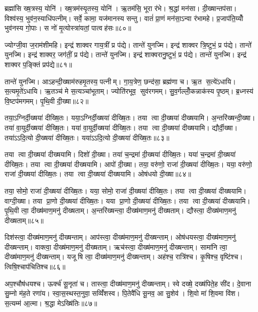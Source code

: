 ब्रह्मा॑सि ख्ष॒त्रस्य॒ योनि॑। ख्ष॒त्रम॑स्यृ॒तस्य॒ योनि॑। ऋ॒तम॑सि॒ भूरा र॑भे। श्र॒द्धां मन॑सा। दी॒ख्षान्तप॑सा। विश्व॑स्य॒ भुव॑न॒स्याधि॑पत्नीम्। सर्वे॒ कामा॒ यज॑मानस्य सन्तु। वातं॑ प्रा॒णं मन॑सा॒ऽन्वा र॑भामहे। प्र॒जाप॑ति॒य्योँ भुव॑नस्य गो॒पाः। स नो॑ मृ॒त्योस्त्रा॑यतां॒ पात्वह॑सः॥८०॥

ज्योग्जी॒वा ज॒राम॑शीमहि। इन्द्र॑ शाक्वर गाय॒त्रीं प्र प॑द्ये। तान्ते॑ युनज्मि। इन्द्र॑ शाक्वर त्रि॒ष्टुभं॒ प्र प॑द्ये। तान्ते॑ युनज्मि। इन्द्र॑ शाक्वर॒ जग॑तीं॒ प्र प॑द्ये। तान्ते॑ युनज्मि। इन्द्र॑ शाक्वरानु॒ष्टुभं॒ प्र प॑द्ये। तान्ते॑ युनज्मि। इन्द्र॑ शाक्वर प॒ङ्क्तिं प्रप॑द्ये॥८१॥

तान्ते॑ युनज्मि। आऽहन्दी॒ख्षाम॑रुहमृ॒तस्य॒ पत्नीम्। गा॒य॒त्रेण॒ छन्द॑सा॒ ब्रह्म॑णा च। ऋ॒त स॒त्ये॑ऽधायि। स॒त्यमृ॒ते॑ऽधायि। ऋ॒तञ्च॑ मे स॒त्यञ्चा॑भूताम्। ज्योति॑रभूव॒ सुव॑रगमम्। सु॒व॒र्गल्लोँ॒कन्नाक॑स्य पृ॒ष्ठम्। ब्र॒ध्नस्य॑ वि॒ष्टप॑मगमम्। पृ॒थि॒वी दी॒ख्षा॥८२॥

तया॒ऽग्निर्दी॒ख्षया॑ दीख्षि॒तः। यया॒ऽग्निर्दी॒ख्षया॑ दीख्षि॒तः। तया त्वा दी॒ख्षया॑ दीख्षयामि। अ॒न्तरि॑ख्षन्दी॒ख्षा। तया॑ वा॒युर्दी॒ख्षया॑ दीख्षि॒तः। यया॑ वा॒युर्दी॒ख्षया॑ दीख्षि॒तः। तया त्वा दी॒ख्षया॑ दीख्षयामि। द्यौर्दी॒ख्षा। तया॑ऽऽदि॒त्यो दी॒ख्षया॑ दीख्षि॒तः। यया॑ऽऽदि॒त्यो दी॒ख्षया॑ दीख्षि॒तः॥८३॥

तया त्वा दी॒ख्षया॑ दीख्षयामि। दिशो॑ दी॒ख्षा। तया॑ च॒न्द्रमा॑ दी॒ख्षया॑ दीख्षि॒तः। यया॑ च॒न्द्रमा॑ दी॒ख्षया॑ दीख्षि॒तः। तया त्वा दी॒ख्षया॑ दीख्षयामि। आपो॑ दी॒ख्षा। तया॒ वरु॑णो॒ राजा॑ दी॒ख्षया॑ दीख्षि॒तः। यया॒ वरु॑णो॒ राजा॑ दी॒ख्षया॑ दीख्षि॒तः। तया त्वा दी॒ख्षया॑ दीख्षयामि। ओष॑धयो दी॒ख्षा॥८४॥

तया॒ सोमो॒ राजा॑ दी॒ख्षया॑ दीख्षि॒तः। यया॒ सोमो॒ राजा॑ दी॒ख्षया॑ दीख्षि॒तः। तया त्वा दी॒ख्षया॑ दीख्षयामि। वाग्दी॒ख्षा। तया प्रा॒णो दी॒ख्षया॑ दीख्षि॒तः। यया प्रा॒णो दी॒ख्षया॑ दीख्षि॒तः। तया त्वा दी॒ख्षया॑ दीख्षयामि। पृ॒थि॒वी त्वा॒ दीख्ष॑माण॒मनु॑ दीख्षताम्। अ॒न्तरि॑ख्षन्त्वा॒ दीख्ष॑माण॒मनु॑ दीख्षताम्। द्यौस्त्वा॒ दीख्ष॑माण॒मनु॑ दीख्षताम्॥८५॥

दिश॑स्त्वा॒ दीख्ष॑माण॒मनु॑ दीख्षन्ताम्। आप॑स्त्वा॒ दीख्ष॑माण॒मनु॑ दीख्षन्ताम्। ओष॑धयस्त्वा॒ दीख्ष॑माण॒मनु॑ दीख्षन्ताम्। वाक्त्वा॒ दीख्ष॑माण॒मनु॑ दीख्षताम्। ऋच॑स्त्वा॒ दीख्ष॑माण॒मनु॑ दीख्षन्ताम्। सामा॑नि त्वा॒ दीख्ष॑माण॒मनु॑ दीख्षन्ताम्। यजूषि त्वा॒ दीख्ष॑माण॒मनु॑ दीख्षन्ताम्। अह॑श्च॒ रात्रि॑श्च। कृ॒षिश्च॒ वृष्टि॑श्च। त्विषि॒श्चाप॑चितिश्च॥८६॥

अप॒श्चौष॑धयश्च। ऊर्क्च॑ सू॒नृता॑ च। तास्त्वा॒ दीख्ष॑माण॒मनु॑ दीख्षन्ताम्। स्वे दख्षे॒ दख्ष॑पिते॒ह सी॑द। दे॒वाना सु॒म्नो म॑ह॒ते रणा॑य। स्वा॒स॒स्थस्त॒नुवा॒ सव्विँ॑शस्व। पि॒तेवै॑धि सू॒नव॒ आ सु॒शेव॑। शि॒वो मा॑ शि॒वमा वि॑श। स॒त्यम्म॑ आ॒त्मा। श्र॒द्धा मेऽख्षि॑तिः॥८७॥

